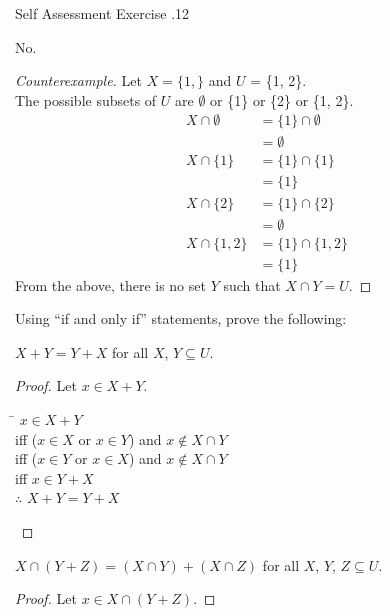 \documentclass[\main/notes.tex]{subfiles}
\begin{document}
\begin{exercise}{Self Assessment Exercise \thechapter.12}
\begin{questions}
						\begin{answer}
							No.
							\begin{proof}[Counterexample]
								Let $X = \{1,\}$ and $U$ = \{1, 2\}.\\
								The possible subsets of $U$ are $\emptyset$ or \{1\} or \{2\} or \{1, 2\}.
								\begin{align*}
									X \cap \emptyset &= \{1\} \cap \emptyset\\
									&= \emptyset\\
									X \cap \{1\} &= \{1\} \cap \{1\}\\
									&= \{1\}\\
									X \cap \{2\} &= \{1\} \cap \{2\}\\
									&= \emptyset\\
									X \cap \{1, 2\} &= \{1\} \cap \{1, 2\}\\
									&= \{1\}
								\end{align*}
								From the above, there is no set $Y$ such that $X \cap Y = U$.
							\end{proof}
						\end{answer}
					\item Using ``if and only if'' statements, prove the following:
						\begin{questions}[first=\bfseries]
							\item $X + Y = Y + X$ for all $X$, $Y \subseteq U$.
								\begin{answer}
									\begin{proof}
										Let $x \in X + Y$.
										\begin{tabbing}
											\qquad \= $x \in X + Y$\\
											iff \> ($x \in X$ or $x \in Y$) and $x \notin X \cap Y$\\
											iff \> ($x \in Y$ or $x \in X$) and $x \notin X \cap Y$\\
											iff \> $x \in Y + X$\\
											$\therefore$ \> $X + Y = Y + X$
										\end{tabbing}
									\end{proof}
								\end{answer}
							\pagebreak
							\item $X \cap (Y + Z) = (X \cap Y) + (X \cap Z)$ for all $X$, $Y$, $Z \subseteq U$.
								\begin{answer}
									\begin{proof}
										Let $x \in X \cap (Y + Z)$.

\end{proof}
\end{answer}
\end{questions}
\end{questions}
\end{exercise}
\end{document}
